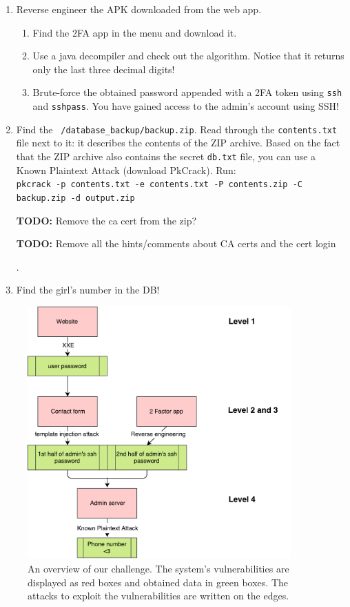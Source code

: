 \documentclass[a4paper]{article}
\newcommand{\TODO}[1]{\begin{center}\large\textbf{TODO:} #1\end{center}}
\begin{document}
\begin{enumerate}
  \item Reverse engineer the APK downloaded from the web app.
        \begin{enumerate}
          \item Find the 2FA app in the menu and download it.
          \item Use a java decompiler and check out the algorithm.
              Notice that it returns only the last three decimal digits!
          \item Brute-force the obtained password appended with a 2FA token
              using \texttt{ssh} and \texttt{sshpass}.
              You have gained access to the admin's account using SSH!
        \end{enumerate}

  \item Find the \texttt{~/database\_backup/backup.zip}. Read through the \texttt{contents.txt} file next to it:
          it describes the contents of the ZIP archive. Based on the fact that the ZIP archive
          also contains the secret \texttt{db.txt} file, you can use a Known Plaintext
        Attack (download PkCrack). Run:\\
        \texttt{pkcrack -p contents.txt -e contents.txt -P contents.zip -C backup.zip -d output.zip}\\
        \TODO{Remove the ca cert from the zip?}
        \TODO{Remove all the hints/comments about CA certs and the cert login}.

  \item Find the girl's number in the DB!

\end{enumerate}

\begin{figure}
    \includegraphics[width=0.9\textwidth]{images/diagram}
    \caption{An overview of our challenge. The system's vulnerabilities
    are displayed as red boxes and obtained data in green boxes. The attacks
    to exploit the vulnerabilities are written on the edges.}
    \label{fig:diag}
\end{figure}
\end{document}
